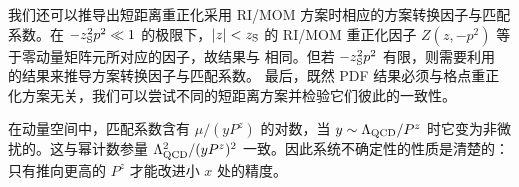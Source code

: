 我们还可以推导出短距离重正化采用 RI/MOM 方案时相应的方案转换因子与匹配系数。在 $-z^2_{\rm S}p^2 \ll 1$ 的极限下，$|z|<z_{\rm S}$ 的 RI/MOM 重正化因子 $Z(z,-p^2)$ 等于零动量矩阵元所对应的因子，故结果与  相同。但若 $-z^2_{\rm S}p^2$ 有限，则需要利用 ~\cite{Constantinou:2017sej,Stewart:2017tvs} 的结果来推导方案转换因子与匹配系数。
最后，既然 PDF 结果必须与格点重正化方案无关，我们可以尝试不同的短距离方案并检验它们彼此的一致性。

在动量空间中，匹配系数含有 $\mu/(yP^z)$ 的对数，当 $y\sim \Lambda_{\rm QCD}/P^z$ 时它变为非微扰的。这与幂计数参量 $\Lambda^2_{\rm QCD}/(yP^z)^2$ 一致。因此系统不确定性的性质是清楚的：只有推向更高的 $P^z$ 才能改进小 $x$ 处的精度。
